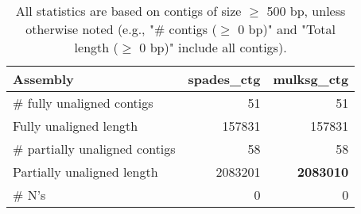 \documentclass[12pt,a4paper]{article}
\begin{document}
\begin{table}[ht]
\begin{center}
\caption{All statistics are based on contigs of size $\geq$ 500 bp, unless otherwise noted (e.g., "\# contigs ($\geq$ 0 bp)" and "Total length ($\geq$ 0 bp)" include all contigs).}
\begin{tabular}{|l*{2}{|r}|}
\hline
Assembly & spades\_ctg & mulksg\_ctg \\ \hline
\# fully unaligned contigs & 51 & 51 \\ \hline
Fully unaligned length & 157831 & 157831 \\ \hline
\# partially unaligned contigs & 58 & 58 \\ \hline
Partially unaligned length & 2083201 & {\bf 2083010} \\ \hline
\# N's & 0 & 0 \\ \hline
\end{tabular}
\end{center}
\end{table}
\end{document}
